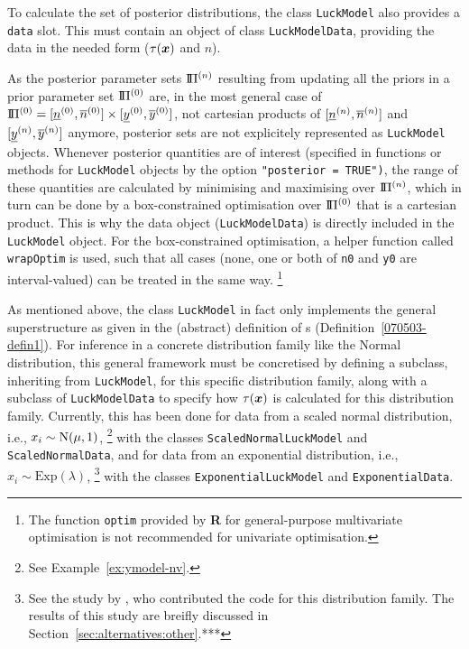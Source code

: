 To calculate the set of posterior distributions,
the class \texttt{LuckModel} also provides a \texttt{data} slot.
This must contain an object of class \texttt{LuckModelData},
providing the data in the needed form ($\tau({\bm x})$ and $n$).

As the posterior parameter sets $\text{I}\!\Pi^{(n)}$ resulting from updating all the priors in a
prior parameter set $\text{I}\!\Pi^{(0)}$ are, in the most general case of $\text{I}\!\Pi^{(0)} = [\underline{n}^{(0)},\overline{n}^{(0)}] \times [\underline{y}^{(0)}, \overline{y}^{(0)}]$,
not cartesian products of $[\underline{n}^{(n)}, \overline{n}^{(n)}]$ and $[\underline{y}^{(n)}, \overline{y}^{(n)}]$ anymore, posterior sets are not
explicitely represented as \texttt{LuckModel} objects. Whenever posterior quantities
are of interest (specified in functions or methods for \texttt{LuckModel} objects by the option \texttt{"posterior = TRUE")},
the range of these quantities are calculated by minimising and maximising over $\text{I}\!\Pi^{(n)}$, %
which in turn can be done by a box-constrained optimisation over $\text{I}\!\Pi^{(0)}$ %
that is a cartesian product.
This is why the data object (\texttt{LuckModelData}) is directly included in the \texttt{LuckModel} object.
For the box-constrained optimisation, a helper function called \texttt{wrapOptim} is used,
such that all cases (none, one or both of \texttt{n0} and \texttt{y0} %
are interval-valued) can be treated in the same way.%
\footnote{The function \texttt{optim} provided by \textbf{R} for general-purpose
multivariate optimisation is not recommended for univariate optimisation.}

As mentioned above, the class \texttt{LuckModel} in fact only implements the general superstructure as given in the
(abstract) definition of \model s (Definition~\ref{070503-defin1}).
For inference in a concrete distribution family like the Normal distribution,
this general framework must be concretised %
by defining a subclass, inheriting from \texttt{LuckModel},
for this specific distribution family,
along with a subclass of \texttt{LuckModelData} to specify how $\tau({\bm x})$
is calculated for this distribution family.
Currently, this has been done for data from a scaled normal distribution,
i.e., $x_i \sim \operatorname{N}(\mu, 1)$,%
\footnote{See Example~\ref{ex:ymodel-nv}.}
with the classes \texttt{ScaledNormalLuckModel} and \texttt{ScaledNormalData},
and for data from an exponential distribution, i.e., $x_i \sim \text{Exp}(\lambda)$,%
\footnote{See the study by \textcite{2011:krautenbacher},
who contributed the code for this distribution family.
The results of this study are breifly discussed in Section~\ref{sec:alternatives:other}.***}
with the classes \texttt{ExponentialLuckModel} and \texttt{ExponentialData}.


